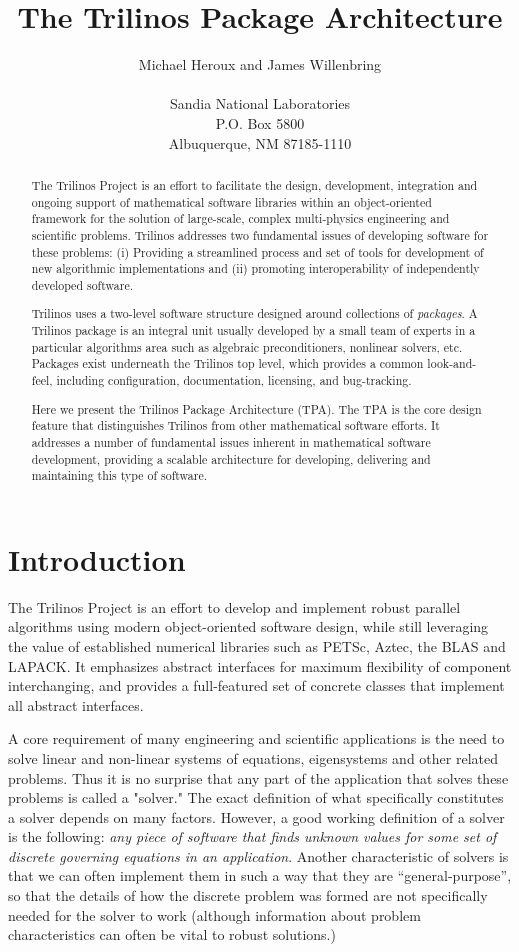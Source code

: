 \documentclass[12pt,relax]{TPA}
\title{The Trilinos Package Architecture}
\author{Michael Heroux and James Willenbring \\
 \\
Sandia National Laboratories \\
P.O. Box 5800 \\
Albuquerque, NM 87185-1110
}
\date{}
\begin{document}
\maketitle

\begin{abstract}
The Trilinos Project is an effort to facilitate the design, development, 
integration and ongoing support of mathematical software libraries within an 
object-oriented framework for the solution of large-scale, complex multi-physics 
engineering and scientific problems.  Trilinos addresses two fundamental issues 
of developing software for these problems: (i) Providing a streamlined process 
and set of tools for development of new algorithmic implementations and (ii) 
promoting interoperability of independently developed software.  

Trilinos uses a two-level software structure designed around
collections of
{\it packages}.  A Trilinos package is an integral unit usually
developed by a small team of experts in a particular algorithms area
such as algebraic preconditioners, nonlinear solvers, etc.  
Packages exist underneath
the Trilinos top level, which provides a common look-and-feel,
including configuration, documentation, licensing, and bug-tracking.

Here we present the Trilinos Package Architecture (TPA).  The TPA is
the core design feature that distinguishes Trilinos from other
mathematical software efforts.  It addresses a number of fundamental
issues inherent in mathematical software development, providing a
scalable architecture for developing, delivering and maintaining 
this type of software.
\end{abstract}


\section{Introduction}

The Trilinos Project is an effort to develop and implement 
robust parallel algorithms using modern object-oriented 
software design, while still leveraging the value of established 
numerical libraries such as PETSc, Aztec, the BLAS and LAPACK. 
It emphasizes abstract interfaces for maximum flexibility of 
component interchanging, and provides a full-featured set of 
concrete classes that implement all abstract interfaces. 

A core requirement of many engineering and scientific 
applications is the need to solve linear and non-linear 
systems of equations, eigensystems and other related problems. 
Thus it is no surprise that any part of the application that 
solves these problems is called a "solver." The exact 
definition of what specifically constitutes a solver 
depends on many factors. However, a good working definition 
of a solver is the following: {\it any piece of software that 
finds unknown values for some set of discrete governing 
equations in an application}. Another characteristic of 
solvers is that we can often implement them in such a way 
that they are ``general-purpose'', so that the details of 
how the discrete problem was formed are not specifically 
needed for the solver to work (although information about 
problem characteristics can often be vital to robust solutions.) 
\end{document}
